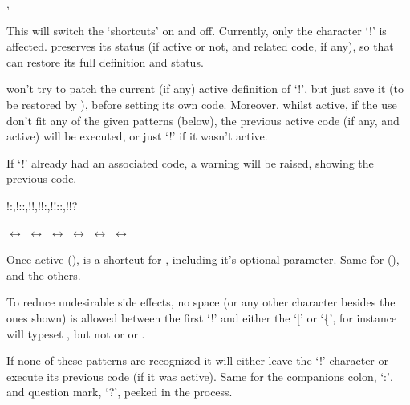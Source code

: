 \documentclass{article}
\begin{document}
\begin{codedescribe}[code]{\tsOn,\tsOff}
\begin{codesyntax}
\tsobj{\tsOn}
\tsobj{\tsOff}
\end{codesyntax}
  This will switch the `shortcuts' on and off. Currently, only the character `!' is affected. \tsobj{\tsOn} preserves its status (if active or not, and related code, if any), so that \tsobj{\tsOff} can restore its full definition and status.
\begin{tsremark}
\tsobj{\tsOn} won't try to patch the current (if any) active definition of `!', but just save it (to be restored by \tsobj{\tsOff}), before setting its own code. Moreover, whilst active, if the use don't fit any of the given patterns (below), the previous active code (if any, and active) will be executed, or just `!' if it wasn't active.
\end{tsremark}
\begin{tsremark}
  If `!' already had an associated code, a warning will be raised, showing the previous code.
\end{tsremark}
\end{codedescribe}

\begin{codedescribe}[code,new=2025/12/29,note=active character,update=2026/02/12]{!:,!::,!!,!!:,!!::,!!?}
\begin{codesyntax}
\tsverb[code]{!:} $\leftrightarrow$ \tsobj{\tsobj}
\tsverb[code]{!::} $\leftrightarrow$ \tsobj{\tsargs}
\tsverb{!!} $\leftrightarrow$ \tsobj{\tsverb}
\tsverb{!!:} $\leftrightarrow$ \tsobj{\tsmeta}
\tsverb{!!::} $\leftrightarrow$ \tsobj{\tsmarginnote}
 $\leftrightarrow$ \tsobj{\tsmacro}
\end{codesyntax}
  Once active (\tsobj{\tsOn}), \tsobj{!:} is a shortcut for \tsobj{\tsobj}, including it's optional parameter. Same for \tsobj{!::} (\tsobj{\tsargs}), and the others.
\end{codedescribe}
\begin{tsremark}
To reduce undesirable side effects, no space (or any other character besides the ones shown) is allowed between the first `!' and either the `[' or `\{', for instance  will typeset , but  not  or  or .
\end{tsremark}
\begin{tsremark}
  If none of these patterns are recognized it will either leave the `!' character or execute its previous code (if it was active). Same for the companions colon, `:', and question mark, `?', peeked in the process.
\end{tsremark}
\end{document}
